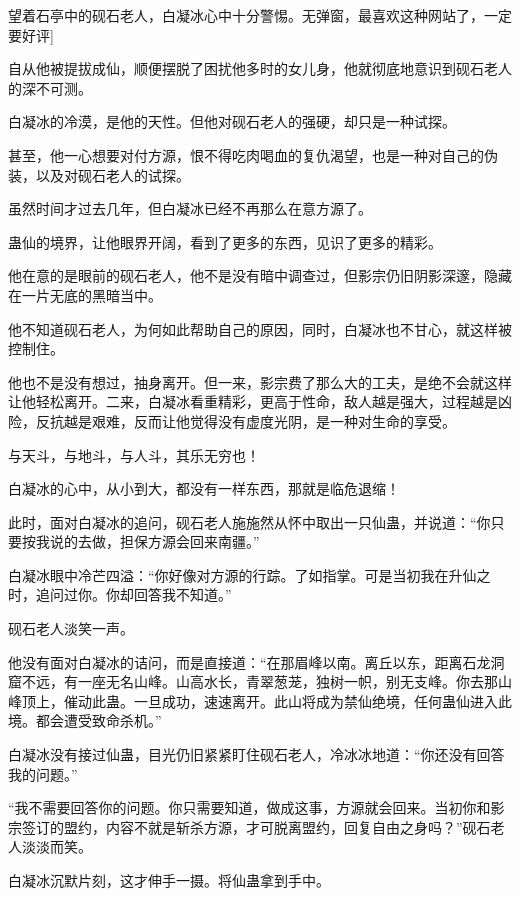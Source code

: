 
\begin{this_body}

望着石亭中的砚石老人，白凝冰心中十分警惕。无弹窗，最喜欢这种网站了，一定要好评]

自从他被提拔成仙，顺便摆脱了困扰他多时的女儿身，他就彻底地意识到砚石老人的深不可测。

白凝冰的冷漠，是他的天性。但他对砚石老人的强硬，却只是一种试探。

甚至，他一心想要对付方源，恨不得吃肉喝血的复仇渴望，也是一种对自己的伪装，以及对砚石老人的试探。

虽然时间才过去几年，但白凝冰已经不再那么在意方源了。

蛊仙的境界，让他眼界开阔，看到了更多的东西，见识了更多的精彩。

他在意的是眼前的砚石老人，他不是没有暗中调查过，但影宗仍旧阴影深邃，隐藏在一片无底的黑暗当中。

他不知道砚石老人，为何如此帮助自己的原因，同时，白凝冰也不甘心，就这样被控制住。

他也不是没有想过，抽身离开。但一来，影宗费了那么大的工夫，是绝不会就这样让他轻松离开。二来，白凝冰看重精彩，更高于性命，敌人越是强大，过程越是凶险，反抗越是艰难，反而让他觉得没有虚度光阴，是一种对生命的享受。

与天斗，与地斗，与人斗，其乐无穷也！

白凝冰的心中，从小到大，都没有一样东西，那就是临危退缩！

此时，面对白凝冰的追问，砚石老人施施然从怀中取出一只仙蛊，并说道：“你只要按我说的去做，担保方源会回来南疆。”

白凝冰眼中冷芒四溢：“你好像对方源的行踪。了如指掌。可是当初我在升仙之时，追问过你。你却回答我不知道。”

砚石老人淡笑一声。

他没有面对白凝冰的诘问，而是直接道：“在那眉峰以南。离丘以东，距离石龙洞窟不远，有一座无名山峰。山高水长，青翠葱茏，独树一帜，别无支峰。你去那山峰顶上，催动此蛊。一旦成功，速速离开。此山将成为禁仙绝境，任何蛊仙进入此境。都会遭受致命杀机。”

白凝冰没有接过仙蛊，目光仍旧紧紧盯住砚石老人，冷冰冰地道：“你还没有回答我的问题。”

“我不需要回答你的问题。你只需要知道，做成这事，方源就会回来。当初你和影宗签订的盟约，内容不就是斩杀方源，才可脱离盟约，回复自由之身吗？”砚石老人淡淡而笑。

白凝冰沉默片刻，这才伸手一摄。将仙蛊拿到手中。


\end{this_body}
